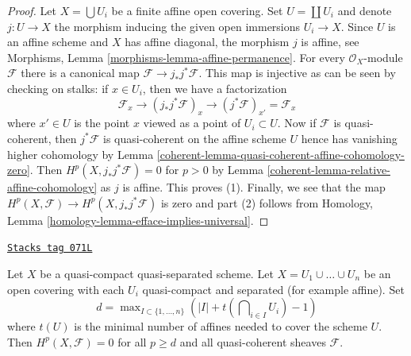 \begin{proof}

Let $X = \bigcup U_i$ be a finite affine open covering.
Set $U = \coprod U_i$ and denote $j : U \to X$
the morphism inducing the given open immersions $U_i \to X$.
Since $U$ is an affine scheme and $X$ has affine diagonal,
the morphism $j$ is affine, see
Morphisms, Lemma \ref{morphisms-lemma-affine-permanence}.
For every $\mathcal{O}_X$-module $\mathcal{F}$ there is
a canonical map $\mathcal{F} \to j_*j^*\mathcal{F}$.
This map is injective as can be seen by checking on stalks:
if $x \in U_i$, then we have a factorization
$$
\mathcal{F}_x \to (j_*j^*\mathcal{F})_x
\to (j^*\mathcal{F})_{x'} = \mathcal{F}_x
$$
where $x' \in U$ is the point $x$ viewed as a point of $U_i \subset U$.
Now if $\mathcal{F}$ is quasi-coherent, then $j^*\mathcal{F}$
is quasi-coherent on the affine scheme $U$ hence has vanishing
higher cohomology by
Lemma \ref{coherent-lemma-quasi-coherent-affine-cohomology-zero}.
Then $H^p(X, j_*j^*\mathcal{F}) = 0$ for
$p > 0$ by Lemma \ref{coherent-lemma-relative-affine-cohomology}
as $j$ is affine. This proves (1).
Finally, we see that the map
$H^p(X, \mathcal{F}) \to H^p(X, j_*j^*\mathcal{F})$
is zero and part (2) follows from
Homology, Lemma \ref{homology-lemma-efface-implies-universal}.
\end{proof}

\begin{lemma}
\label{coherent-lemma-vanishing-nr-affines-quasi-separated}
\href{https://stacks.math.columbia.edu/tag/071L}{\texttt{Stacks tag 071L}}

Let $X$ be a quasi-compact quasi-separated scheme.
Let $X = U_1 \cup \ldots \cup U_n$ be an open covering
with each $U_i$ quasi-compact and separated (for example affine).
Set
$$
d = \max\nolimits_{I \subset \{1, \ldots, n\}}
\left(|I| + t(\bigcap\nolimits_{i \in I} U_i) - 1\right)
$$
where $t(U)$ is the minimal number of affines needed to cover
the scheme $U$. Then $H^p(X, \mathcal{F}) = 0$ for all $p \geq d$ and all
quasi-coherent sheaves $\mathcal{F}$.
\end{lemma}

